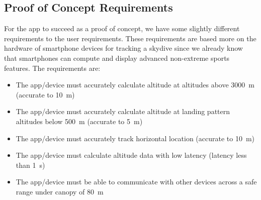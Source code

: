\subsection{Proof of Concept Requirements}\label{subsec:proof-requirements}
For the app to succeed as a proof of concept, we have some slightly different requirements to the user requirements. These requirements are based more on the hardware of smartphone devices for tracking a skydive since we already know that smartphones can compute and display advanced non-extreme sports features.
The requirements are:
\begin{itemize}
  \item The app/device must accurately calculate altitude at altitudes above \SI{3000}{\metre} (accurate to \SI{10}{\metre})
  \item The app/device must accurately calculate altitude at landing pattern altitudes below \SI{500}{\metre} (accurate to \SI{5}{\metre})
  \item The app/device must accurately track horizontal location (accurate to \SI{10}{\metre})
  \item The app/device must calculate altitude data with low latency (latency less than \SI{1}{\second})
  \item The app/device must be able to communicate with other devices across a safe range under canopy of \SI{80}{\metre}
\end{itemize}
